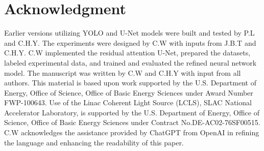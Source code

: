 \documentclass[a4paper]{article}
\begin{document}
\section*{Acknowledgment}

Earlier versions utilizing YOLO and U-Net models were built and tested by P.L and C.H.Y.  The experiments were designed by C.W with inputs from J.B.T and C.H.Y.  C.W implemented the residual attention U-Net, prepared the datasets, labeled experimental data, and trained and evaluated the refined neural network model.  The manuscript was written by C.W and C.H.Y with input from all authors.  This material is based upon work supported by the U.S.  Department of Energy, Office of Science, Office of Basic Energy Sciences under Award Number FWP-100643.  Use of the Linac Coherent Light Source (LCLS), SLAC National Accelerator Laboratory, is supported by the U.S.  Department of Energy, Office of Science, Office of Basic Energy Sciences under Contract No.DE-AC02-76SF00515.  C.W acknowledges the assistance provided by ChatGPT from OpenAI in refining the language and enhancing the readability of this paper.
\end{document}
